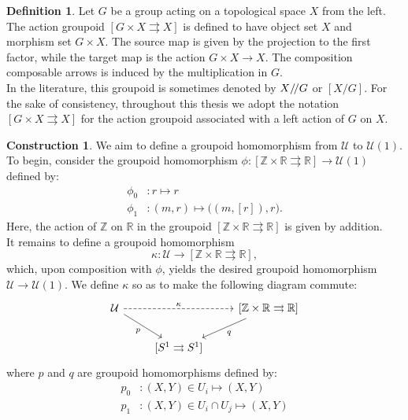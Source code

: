 \documentclass{article}
\theoremstyle{plain}
\theoremstyle{definition}
\newtheorem{defn}[thm]{Definition}
\newtheorem{const}[thm]{Construction}
\newcommand{\salash}{\mathbin{/\mkern-3mu/}}
\begin{document}
\begin{defn}
\cite[Section 1.3 on page 207]{MR1950948} Let $G$ be a group acting on a topological space $X$ from the left. The action groupoid $[G \times X \rightrightarrows X]$ is defined to have object set $X$ and morphism set $G \times X$. The source map is given by the projection to the first factor, while the target map is the action $G \times X \longrightarrow X$. The composition composable arrows is induced by the multiplication in $G$. \\
In the literature, this groupoid is sometimes denoted by $X{\salash}G$ or $[X/G]$. For the sake of consistency, throughout this thesis we adopt the notation $[G \times X \rightrightarrows X]$ for the action groupoid associated with a left action of $G$ on $X$.
\end{defn}
\begin{const}\label{phiandkappa}
We aim to define a groupoid homomorphism from $\mathcal{U}$ to $\mathcal{U}(1)$. To begin, consider the groupoid homomorphism $\phi:[\mathbb{Z} \times \mathbb{R} \rightrightarrows \mathbb{R}] \longrightarrow \mathcal{U}(1)$ defined by:
\begin{align*}
\phi_0 & : r \mapsto r \\
\phi_1 & : (m,r) \mapsto \bigl((m,[r]),r\bigr).
\end{align*}
Here, the action of $\mathbb{Z}$ on $\mathbb{R}$ in the groupoid $[\mathbb{Z} \times \mathbb{R} \rightrightarrows \mathbb{R}]$ is given by addition. \\
It remains to define a groupoid homomorphism
$$\kappa:\mathcal{U} \longrightarrow [\mathbb{Z} \times \mathbb{R} \rightrightarrows \mathbb{R}],$$ which, upon composition with $\phi$, yields the desired groupoid homomorphism $\mathcal{U} \longrightarrow \mathcal{U}(1)$. We define $\kappa$ so as to make the following diagram commute:
\begin{equation}\label{kappacomm}
\begin{tikzcd}
\mathcal{U} \arrow[rr,dashed,"\kappa"] \arrow[dr,"p"'] & & {[}\mathbb{Z} \times \mathbb{R} \rightrightarrows \mathbb{R}{]} \arrow[dl,"q"] \\
& {[}S^1 \rightrightarrows S^1{]} &
\end{tikzcd}
\end{equation}
where $p$ and $q$ are groupoid homomorphisms defined by:
\begin{align*}
p_0 & : (X,Y) \in U_i \mapsto (X,Y) \\
p_1 & : (X,Y) \in U_i \cap U_j \mapsto (X,Y)
\end{align*}

\end{const}
\end{document}
